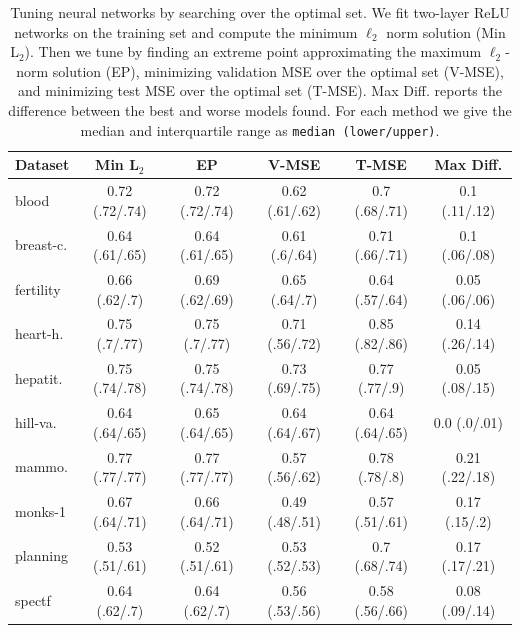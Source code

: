 \setlength{\tabcolsep}{2pt} %

\begin{table}[t]
    \centering
    \caption{Tuning neural networks by searching over the optimal set.
        We fit two-layer ReLU networks on the training set and
        compute the minimum \( \ell_2 \) norm solution (Min L$_2$).
        Then we tune by finding an extreme point approximating
        the maximum \( \ell_2 \)-norm solution (EP), minimizing validation
        MSE over the optimal set (V-MSE), and minimizing test MSE over
        the optimal set (T-MSE).
        Max Diff. reports the difference between the best and worse models
        found.
        For each method we give the median and interquartile range as
        \texttt{median (lower/upper)}.
    }
    \small
    \label{table:tuning-full}
    \vspace{0.1in}
    \begin{tabular}{lccccc} \toprule
        \textbf{Dataset}  & \textbf{Min L$_2$} & \textbf{EP}      & \textbf{V-MSE}   & \textbf{T-MSE}   & \textbf{Max Diff.} \\
        \midrule
        blood             & 0.72 (.72/.74)   & 0.72 (.72/.74) & 0.62 (.61/.62) & 0.7 (.68/.71)  & 0.1 (.11/.12)    \\
        breast-c.     & 0.64 (.61/.65)   & 0.64 (.61/.65) & 0.61 (.6/.64)  & 0.71 (.66/.71) & 0.1 (.06/.08)    \\
        fertility         & 0.66 (.62/.7)    & 0.69 (.62/.69) & 0.65 (.64/.7)  & 0.64 (.57/.64) & 0.05 (.06/.06)   \\
        heart-h.   & 0.75 (.7/.77)    & 0.75 (.7/.77)  & 0.71 (.56/.72) & 0.85 (.82/.86) & 0.14 (.26/.14)   \\
        hepatit.         & 0.75 (.74/.78)   & 0.75 (.74/.78) & 0.73 (.69/.75) & 0.77 (.77/.9)  & 0.05 (.08/.15)   \\
        hill-va.       & 0.64 (.64/.65)   & 0.65 (.64/.65) & 0.64 (.64/.67) & 0.64 (.64/.65) & 0.0 (.0/.01)     \\
        mammo.      & 0.77 (.77/.77)   & 0.77 (.77/.77) & 0.57 (.56/.62) & 0.78 (.78/.8)  & 0.21 (.22/.18)   \\
        monks-1           & 0.67 (.64/.71)   & 0.66 (.64/.71) & 0.49 (.48/.51) & 0.57 (.51/.61) & 0.17 (.15/.2)    \\
        planning          & 0.53 (.51/.61)   & 0.52 (.51/.61) & 0.53 (.52/.53) & 0.7 (.68/.74)  & 0.17 (.17/.21)   \\
        spectf            & 0.64 (.62/.7)    & 0.64 (.62/.7)  & 0.56 (.53/.56) & 0.58 (.56/.66) & 0.08 (.09/.14)   \\

\end{tabular}
\end{table}
